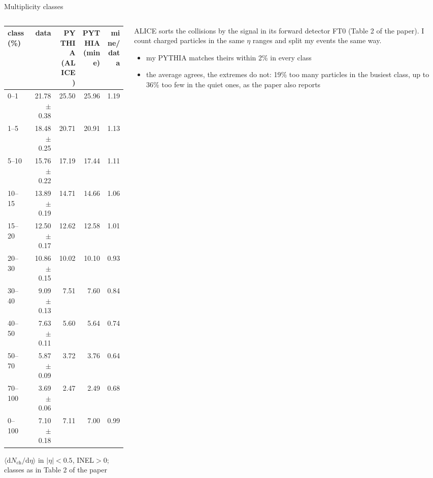 \documentclass[aspectratio=169,11pt]{beamer}
\newcommand{\dndeta}{\ensuremath{\mathrm{d}N_\mathrm{ch}/\mathrm{d}\eta}}
\begin{document}
\begin{frame}{Multiplicity classes}
  \begin{columns}[T]
    \begin{column}{0.56\textwidth}
      \footnotesize
      \begin{tabular}{lrrrr}
        \toprule
        class (\%) & data & \shortstack[r]{PYTHIA\\(ALICE)} & \shortstack[r]{PYTHIA\\(mine)} & \shortstack[r]{mine/\\data} \\
        \midrule
        0--1    & 21.78 $\pm$ 0.38 & 25.50 & 25.96 & 1.19 \\
        1--5    & 18.48 $\pm$ 0.25 & 20.71 & 20.91 & 1.13 \\
        5--10   & 15.76 $\pm$ 0.22 & 17.19 & 17.44 & 1.11 \\
        10--15  & 13.89 $\pm$ 0.19 & 14.71 & 14.66 & 1.06 \\
        15--20  & 12.50 $\pm$ 0.17 & 12.62 & 12.58 & 1.01 \\
        20--30  & 10.86 $\pm$ 0.15 & 10.02 & 10.10 & 0.93 \\
        30--40  & 9.09 $\pm$ 0.13  & 7.51  & 7.60  & 0.84 \\
        40--50  & 7.63 $\pm$ 0.11  & 5.60  & 5.64  & 0.74 \\
        50--70  & 5.87 $\pm$ 0.09  & 3.72  & 3.76  & 0.64 \\
        70--100 & 3.69 $\pm$ 0.06  & 2.47  & 2.49  & 0.68 \\
        \midrule
        0--100  & 7.10 $\pm$ 0.18  & 7.11  & 7.00  & 0.99 \\
        \bottomrule
      \end{tabular}

      \vspace{0.2em}
      {\scriptsize $\langle\dndeta\rangle$ in $|\eta| < 0.5$, INEL$>$0; classes as in Table 2 of the paper}
    \end{column}
    \begin{column}{0.4\textwidth}
      \small
      ALICE sorts the collisions by the signal in its forward detector FT0 (Table 2 of the paper).
      I count charged particles in the same $\eta$ ranges and split my events the same way.
      \begin{itemize}
        \item my PYTHIA matches theirs within 2\% in every class
        \item the average agrees, the extremes do not: 19\% too many particles in the busiest class,
              up to 36\% too few in the quiet ones, as the paper also reports
      \end{itemize}
    \end{column}
  \end{columns}
\end{frame}
\end{document}
